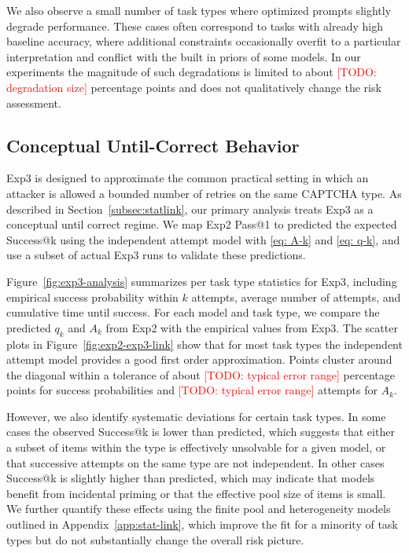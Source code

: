 \documentclass[sigconf, review]{acmart}
\begin{document}
We also observe a small number of task types where optimized prompts slightly degrade performance. These cases often correspond to tasks with already high baseline accuracy, where additional constraints occasionally overfit to a particular interpretation and conflict with the built in priors of some models. In our experiments the magnitude of such degradations is limited to about \textcolor{red}{[TODO: degradation size]} percentage points and does not qualitatively change the risk assessment.

\subsection{Conceptual Until-Correct Behavior}

Exp3 is designed to approximate the common practical setting in which an attacker is allowed a bounded number of retries on the same CAPTCHA type. As described in Section~\ref{subsec:statlink}, our primary analysis treats Exp3 as a conceptual until correct regime. We map Exp2 Pass@1 to predicted the expected Success@k using the independent attempt model with \ref{eq: A-k} and \ref{eq: q-k}, and use a subset of actual Exp3 runs to validate these predictions.

Figure~\ref{fig:exp3-analysis} summarizes per task type statistics for Exp3, including empirical success probability within $k$ attempts, average number of attempts, and cumulative time until success. For each model and task type, we compare the predicted $q_k$ and $A_k$ from Exp2 with the empirical values from Exp3. The scatter plots in Figure~\ref{fig:exp2-exp3-link} show that for most task types the independent attempt model provides a good first order approximation. Points cluster around the diagonal within a tolerance of about \textcolor{red}{[TODO: typical error range]} percentage points for success probabilities and \textcolor{red}{[TODO: typical error range]} attempts for $A_k$.

However, we also identify systematic deviations for certain task types. In some cases the observed Success@k is lower than predicted, which suggests that either a subset of items within the type is effectively unsolvable for a given model, or that successive attempts on the same type are not independent. In other cases Success@k is slightly higher than predicted, which may indicate that models benefit from incidental priming or that the effective pool size of items is small. We further quantify these effects using the finite pool and heterogeneity models outlined in Appendix~\ref{app:stat-link}, which improve the fit for a minority of task types but do not substantially change the overall risk picture.
\end{document}
